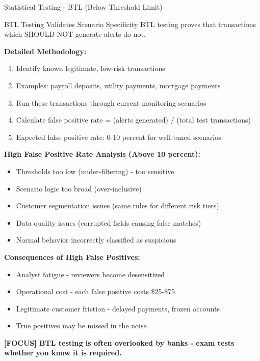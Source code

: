 \documentclass[11pt,a4paper]{beamer}
\newcommand{\examfocus}[1]{\textcolor{orange!80!black}{\textbf{[FOCUS] #1}}}
\begin{document}
\begin{frame}{Statistical Testing - BTL (Below Threshold Limit)}
	\begin{block}{BTL Testing Validates Scenario Specificity}
		BTL testing proves that transactions which SHOULD NOT generate alerts do not.
	\end{block}
	
	\textbf{Detailed Methodology:}
	\begin{enumerate}
		\item Identify known legitimate, low-risk transactions
		\item Examples: payroll deposits, utility payments, mortgage payments
		\item Run these transactions through current monitoring scenarios
		\item Calculate false positive rate = (alerts generated) / (total test transactions)
		\item Expected false positive rate: 0-10 percent for well-tuned scenarios
	\end{enumerate}
	
	\textbf{High False Positive Rate Analysis (Above 10 percent):}
	\begin{itemize}
		\item Thresholds too low (under-filtering) - too sensitive
		\item Scenario logic too broad (over-inclusive)
		\item Customer segmentation issues (same rules for different risk tiers)
		\item Data quality issues (corrupted fields causing false matches)
		\item Normal behavior incorrectly classified as suspicious
	\end{itemize}
	
	\textbf{Consequences of High False Positives:}
	\begin{itemize}
		\item Analyst fatigue - reviewers become desensitized
		\item Operational cost - each false positive costs \$25-\$75
		\item Legitimate customer friction - delayed payments, frozen accounts
		\item True positives may be missed in the noise
	\end{itemize}
	
	\examfocus{BTL testing is often overlooked by banks - exam tests whether you know it is required.}
\end{frame}
\end{document}
